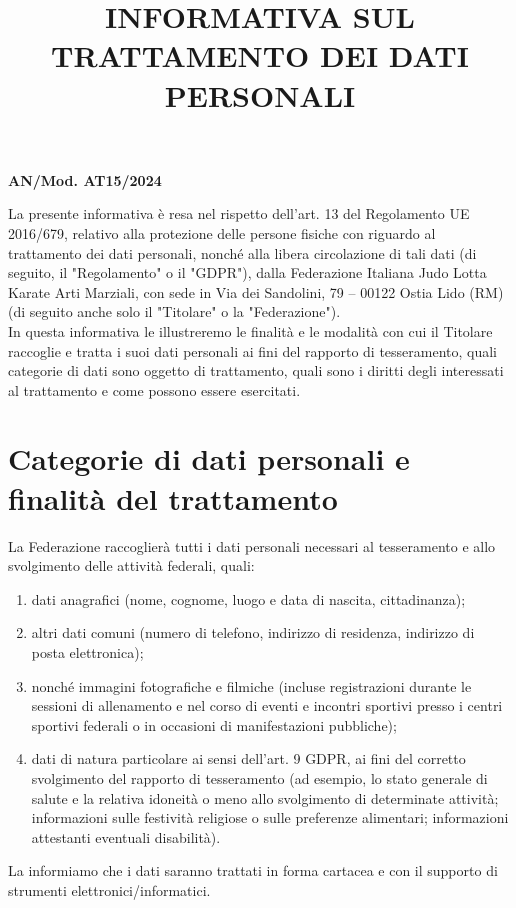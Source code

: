 \documentclass[
	twocolumn
]{djts}
\title{INFORMATIVA SUL TRATTAMENTO DEI DATI PERSONALI}
\makeatletter
\renewcommand{\maketitle}{%
	\begin{center}%
		\textbf{\large \@title}%
	\end{center}%
}
\makeatother
\begin{document}
	\fontsize{8pt}{9pt}\selectfont
	
	\begin{flushright}
		\textbf{AN/Mod. AT15/2024}
	\end{flushright}
	
	\maketitle
	
	La presente informativa è resa nel rispetto dell'art. 13 del Regolamento UE 2016/679, relativo alla protezione delle persone fisiche con riguardo al trattamento dei dati personali, nonché alla libera circolazione di tali dati (di seguito, il "Regolamento" o il "GDPR"), dalla Federazione Italiana Judo Lotta Karate Arti Marziali, con sede in Via dei Sandolini, 79 – 00122 Ostia Lido (RM) (di seguito anche solo il "Titolare" o la "Federazione"). \\
	In questa informativa le illustreremo le finalità e le modalità con cui il Titolare raccoglie e tratta i suoi dati personali ai fini del rapporto di tesseramento, quali categorie di dati sono oggetto di trattamento, quali sono i diritti degli interessati al trattamento e come possono essere esercitati.
	
	\section{Categorie di dati personali e finalità del trattamento}
	La Federazione raccoglierà tutti i dati personali necessari al tesseramento e allo svolgimento delle attività federali, quali:
	\begin{enumerate}[label=\alph{*}.]
		\item dati anagrafici (nome, cognome, luogo e data di nascita, cittadinanza);
		\item altri dati comuni (numero di telefono, indirizzo di residenza, indirizzo di posta elettronica);
		\item nonché immagini fotografiche e filmiche (incluse registrazioni durante le sessioni di allenamento e nel corso di eventi e incontri sportivi presso i centri sportivi federali o in occasioni di manifestazioni pubbliche);
		\item dati di natura particolare ai sensi dell'art. 9 GDPR, ai fini del corretto svolgimento del rapporto di tesseramento (ad esempio, lo stato generale di salute e la relativa idoneità o meno allo svolgimento di determinate attività; informazioni sulle festività religiose o sulle preferenze alimentari; informazioni attestanti eventuali disabilità).
	\end{enumerate}
	La informiamo che i dati saranno trattati in forma cartacea e con il supporto di strumenti elettronici/informatici.
	
\end{document}
